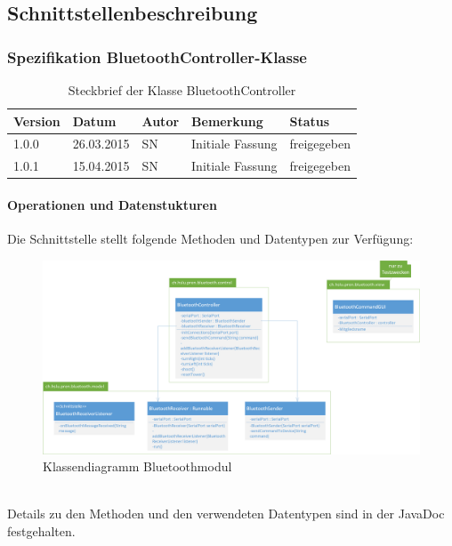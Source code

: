 \subsection{Schnittstellenbeschreibung}
\subsubsection{Spezifikation BluetoothController-Klasse}


\begin{table}[h!]
\begin{tabular}{|l|l|l|l|l|}
\hline 
Version & Datum & Autor & Bemerkung & Status \\ 
\hline 
1.0.0 & 26.03.2015 & SN & Initiale Fassung & freigegeben \\ 
\hline 
1.0.1 & 15.04.2015 & SN & Initiale Fassung & freigegeben \\ 
\hline 
\end{tabular} 
\caption{Steckbrief der Klasse BluetoothController}
\end{table}

\paragraph{Operationen und Datenstukturen}
 
Die Schnittstelle stellt folgende Methoden und Datentypen zur Verfügung:  \\
\begin{figure}[h!]          
	\centering             
	\includegraphics[width=1\textwidth]{../fig/Klassendiagramm Bluetoothmodul.png}
	\caption{Klassendiagramm Bluetoothmodul}
	\label{fig:Klassendiagramm Bluetoothmodul}        
\end{figure} \\
Details zu den Methoden und den verwendeten Datentypen sind in der JavaDoc festgehalten. \\
